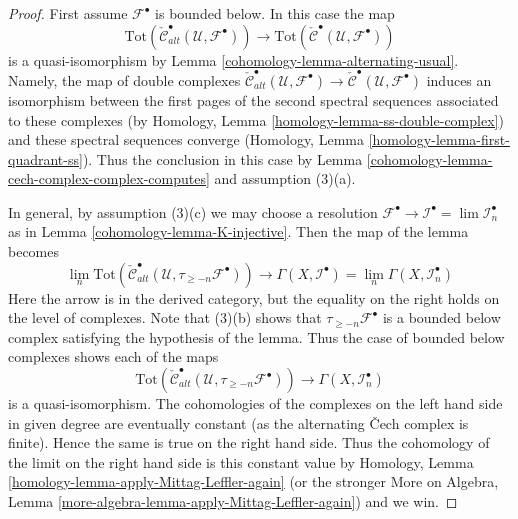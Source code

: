 \begin{proof}

First assume $\mathcal{F}^\bullet$ is bounded below. In this case the map
$$
\text{Tot}(\check{\mathcal{C}}^\bullet_{alt}(\mathcal{U}, \mathcal{F}^\bullet))
\longrightarrow
\text{Tot}(\check{\mathcal{C}}^\bullet(\mathcal{U}, \mathcal{F}^\bullet))
$$
is a quasi-isomorphism by Lemma \ref{cohomology-lemma-alternating-usual}.
Namely, the map of double complexes
$\check{\mathcal{C}}^\bullet_{alt}(\mathcal{U}, \mathcal{F}^\bullet) \to
\check{\mathcal{C}}^\bullet(\mathcal{U}, \mathcal{F}^\bullet)$
induces an isomorphism between the first pages of the second spectral sequences
associated to these complexes
(by Homology, Lemma \ref{homology-lemma-ss-double-complex})
and these spectral sequences converge
(Homology, Lemma \ref{homology-lemma-first-quadrant-ss}).
Thus the conclusion in this case by
Lemma \ref{cohomology-lemma-cech-complex-complex-computes} and assumption (3)(a).

\medskip\noindent
In general, by assumption (3)(c) we may choose a resolution
$\mathcal{F}^\bullet \to \mathcal{I}^\bullet = \lim \mathcal{I}_n^\bullet$
as in Lemma \ref{cohomology-lemma-K-injective}.
Then the map of the lemma becomes
$$
\lim_n
\text{Tot}(\check{\mathcal{C}}^\bullet_{alt}(\mathcal{U},
\tau_{\geq -n}\mathcal{F}^\bullet))
\longrightarrow
\Gamma(X, \mathcal{I}^\bullet) =
\lim_n \Gamma(X, \mathcal{I}_n^\bullet)
$$
Here the arrow is in the derived category, but the equality on the
right holds on the level of complexes.
Note that (3)(b) shows that $\tau_{\geq -n}\mathcal{F}^\bullet$
is a bounded below complex satisfying the hypothesis of the lemma.
Thus the case of bounded below complexes shows each of the maps
$$
\text{Tot}(\check{\mathcal{C}}^\bullet_{alt}(\mathcal{U},
\tau_{\geq -n}\mathcal{F}^\bullet))
\longrightarrow
\Gamma(X, \mathcal{I}_n^\bullet)
$$
is a quasi-isomorphism. The cohomologies of the complexes on the left
hand side in given degree are eventually
constant (as the alternating {\v C}ech complex is finite).
Hence the same is true on the right hand side.
Thus the cohomology of the limit on the right hand side is
this constant value by
Homology, Lemma \ref{homology-lemma-apply-Mittag-Leffler-again}
(or the stronger More on Algebra, Lemma
\ref{more-algebra-lemma-apply-Mittag-Leffler-again})
and we win.
\end{proof}

